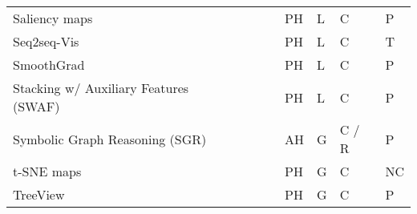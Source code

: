 \documentclass[final,1p,times]{elsarticle}
\begin{document}
\begin{table}[htbp]
\begin{tabular}{m{3.9cm} m{2.7cm} m{0.5cm} m{0.5cm} m{0.5cm} m{0.6cm} m{0.8cm} m{1.05cm}}
    Saliency maps &  \citeauthor{simonyan2014deep} & \cite{simonyan2014deep} &  \citeyear{simonyan2014deep} & PH & L & C & P\\
    Seq2seq-Vis &  \citeauthor{strobelt2018s} &  \cite{strobelt2018s} &  \citeyear{strobelt2018s} & PH & L & C & T\\
    SmoothGrad &  \citeauthor{smilkov2017smoothgrad} & \cite{smilkov2017smoothgrad} &  \citeyear{smilkov2017smoothgrad} & PH & L & C & P\\
    Stacking w/ Auxiliary Features (SWAF) & \citeauthor{rajani2017using} &  \cite{rajani2017using} &  \citeyear{rajani2017using} & PH & L & C & P\\
    Symbolic Graph Reasoning (SGR) & \citeauthor{liang2018symbolic} &  \cite{liang2018symbolic} &  \citeyear{liang2018symbolic} & AH & G & C / R & P\\
    t-SNE maps & \citeauthor{zahavy2016graying} & \cite{zahavy2016graying} &  \citeyear{zahavy2016graying} & PH & G & C & NC\\
    TreeView & \citeauthor{thiagarajan2016treeview} & \cite{thiagarajan2016treeview} & \citeyear{thiagarajan2016treeview} & PH & G & C & P\\
    \hline
\end{tabular}
\end{table}
\end{document}
